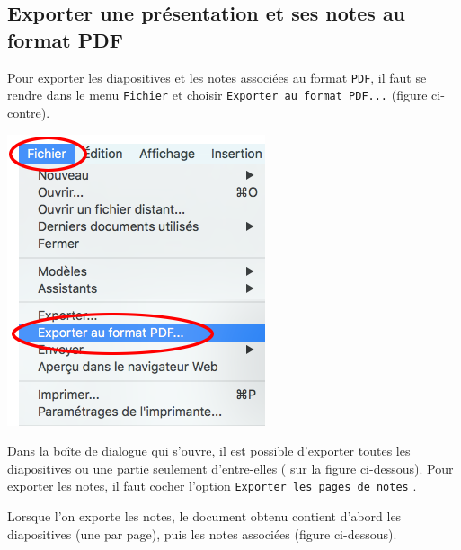 \subsection{Exporter une présentation et ses notes au format PDF}\label{Presentation1exportPDF}


\begin{minipage}[c]{.58\textwidth}
Pour exporter les diapositives et les notes associées au format \texttt{PDF}, il faut se rendre dans le menu \texttt{Fichier} et choisir \texttt{Exporter au format PDF...} (figure ci-contre). 
\end{minipage}\hfill%
\begin{minipage}[c]{.38\textwidth}
\centering%
\includegraphics[angle=0,width=.7\textwidth]{./images/presentation/Impress1_exportPDF01}
\end{minipage}

\vspace{1em}

Dans la boîte de dialogue qui s'ouvre, il est possible d'exporter toutes les diapositives ou une partie seulement d'entre-elles ( sur la figure ci-dessous). Pour exporter les notes, il faut cocher l'option \texttt{Exporter les pages de notes} .



Lorsque l'on exporte les notes, le document obtenu contient d'abord les diapositives (une par page), puis les notes associées (figure ci-dessous).

